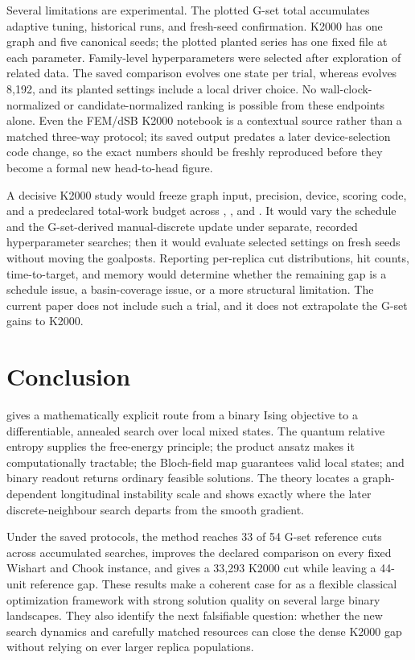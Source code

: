 Several limitations are experimental. The plotted G-set total
accumulates adaptive tuning, historical runs, and fresh-seed
confirmation. K2000 has one graph and five canonical \QeFEM{} seeds;
the plotted planted series has one fixed file at each parameter.
Family-level hyperparameters were selected after exploration of related
data. The saved \LQA{} comparison evolves one state per trial, whereas
\QeFEM{} evolves 8,192, and its planted settings include a local driver
choice. No wall-clock-normalized or candidate-normalized ranking is
possible from these endpoints alone. Even the FEM/dSB K2000 notebook
is a contextual source rather than a matched three-way protocol; its
saved output predates a later device-selection code change, so the
exact numbers should be freshly reproduced before they become a formal
new head-to-head figure.

A decisive K2000 study would freeze graph input, precision, device,
scoring code, and a predeclared total-work budget across \QeFEM{},
\FEM{}, and \dSB{}. It would vary the \QeFEM{} schedule and the
G-set-derived manual-discrete update under separate, recorded
hyperparameter searches; then it would evaluate selected settings on
fresh seeds without moving the goalposts. Reporting per-replica cut
distributions, hit counts, time-to-target, and memory would determine
whether the remaining gap is a schedule issue, a basin-coverage issue,
or a more structural limitation. The current paper does not include
such a trial, and it does not extrapolate the G-set gains to K2000.

\section{Conclusion}

\QeFEM{} gives a mathematically explicit route from a binary Ising
objective to a differentiable, annealed search over local mixed states.
The quantum relative entropy supplies the free-energy principle; the
product ansatz makes it computationally tractable; the Bloch-field map
guarantees valid local states; and binary readout returns ordinary
feasible solutions. The theory locates a graph-dependent longitudinal
instability scale and shows exactly where the later discrete-neighbour
search departs from the smooth gradient.

Under the saved protocols, the method reaches 33 of 54 G-set reference
cuts across accumulated searches, improves the declared \LQA{}
comparison on every fixed Wishart and Chook instance, and gives a
33,293 K2000 cut while leaving a 44-unit reference gap. These results
make a coherent case for \QeFEM{} as a flexible classical optimization
framework with strong solution quality on several large binary
landscapes. They also identify the next falsifiable question: whether
the new search dynamics and carefully matched resources can close the
dense K2000 gap without relying on ever larger replica populations.

